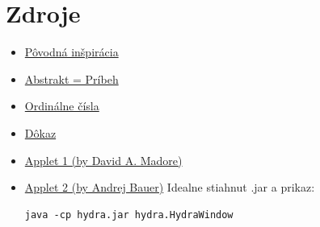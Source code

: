 \documentclass[12pt,a4paper]{article}
\begin{document}
\section*{Zdroje} 
\begin{itemize} 
\item \href{http://www.quora.com/Mathematics/What-are-some-of-the-most-counterintuitive-mathematical-results/answer/Michal-Fori\%C5\%A1ek?ref=fb}{Pôvodná inšpirácia}
\item \href{http://en.wikipedia.org/wiki/Lernaean_Hydra}{Abstrakt = Príbeh}  
\item \href{http://en.wikipedia.org/wiki/Ordinal_number}{Ordinálne čísla}
\item \href{http://en.wikipedia.org/wiki/Goodstein's_theorem}{Dôkaz}
\item \href{http://www.madore.org/~david/math/hydra.xhtml}{Applet 1 (by David A. Madore)} 
\item \href{http://math.andrej.com/wp-content/uploads/2008/02/Hydra/hydraApplet.html}{Applet 2 (by Andrej Bauer)} Idealne stiahnut .jar a prikaz: 
\begin{lstlisting}
java -cp hydra.jar hydra.HydraWindow
\end{lstlisting}
\end{itemize} 
\end{document}
